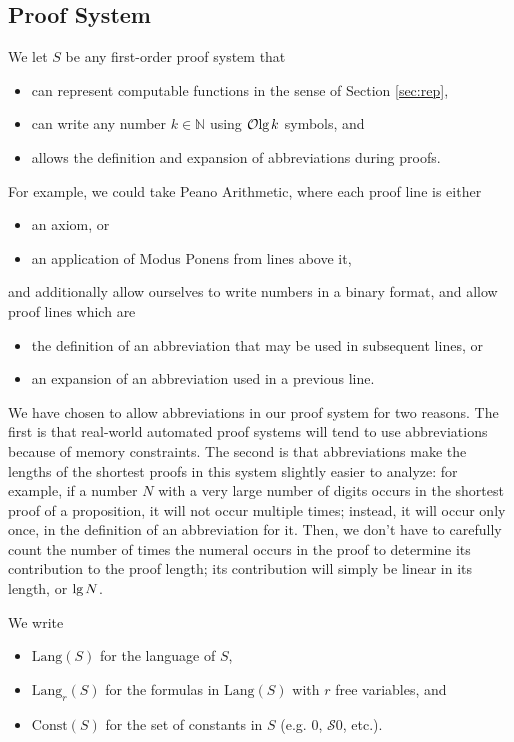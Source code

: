 \documentclass[onecolumn,authordate]{miri-tech-article}
\numberwithin{equation}{section}
\theoremstyle{definition}
\newcommand{\NN}{\mathbb{N}}
\newcommand{\Oo}{\mathcal{O}}
\newcommand{\Ss}{\mathcal{S}}
\newcommand{\Lang}{\mathrm{Lang}}
\newcommand{\Const}{\mathrm{Const}}
\renewcommand{\lg}{\mathrm{lg\hspace{0.3ex}}}
\renewcommand{\-}{^{-1}}
\begin{document}
\subsection{Proof System}\label{sec:system}
We let $S$ be any first-order proof system that
\begin{itemize}
\item[1)] can represent computable functions in the sense of Section \ref{sec:rep},
\item[2)] can write any number $k\in\NN$ using $\Oo\lg k$ symbols, and 
\item[3)] allows the definition and expansion of abbreviations during proofs.
\end{itemize}
For example, we could take Peano Arithmetic, where each proof line is either 
\begin{itemize}
\item an axiom, or
\item an application of Modus Ponens from lines above it,
\end{itemize}
and additionally allow ourselves to write numbers in a binary format, and allow proof lines which are
\begin{itemize}
\item the definition of an abbreviation that may be used in subsequent lines, or 
\item an expansion of an abbreviation used in a previous line.
\end{itemize}

\noindent We have chosen to allow abbreviations in our proof system for two reasons.  The first is that real-world automated proof systems will tend to use abbreviations because of memory constraints.  The second is that abbreviations make the lengths of the shortest proofs in this system slightly easier to analyze: for example, if a number $N$ with a very large number of digits occurs in the shortest proof of a proposition, it will not occur multiple times; instead, it will occur only once, in the definition of an abbreviation for it.  Then, we don't have to carefully count the number of times the numeral occurs in the proof to determine its contribution to the proof length; its contribution will simply be linear in its length, or $\lg N$.

We write 
\begin{itemize}
\item[] $\Lang(S)$ for the language of $S$, 
\item[] $\Lang_r(S)$ for the formulas in $\Lang(S)$ with $r$ free variables, and 
\item[] $\Const(S)$ for the set of constants in $S$ (e.g. $0$, $\Ss 0$, etc.).
\end{itemize}
\end{document}
